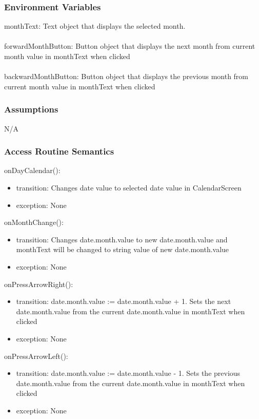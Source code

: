 \documentclass[12pt, titlepage]{article}
\begin{document}
\subsubsection{Environment Variables}

monthText: Text object that displays the selected month.\\\\
forwardMonthButton: Button object that displays the next month from current month value in monthText when clicked\\\\
backwardMonthButton: Button object that displays the previous month from current month value in monthText when clicked


\subsubsection{Assumptions}

N/A

\subsubsection{Access Routine Semantics}

\noindent onDayCalendar():
\begin{itemize}
	\item transition: Changes date value to selected date value in CalendarScreen 
	\item exception: None
\end{itemize}

\noindent onMonthChange():
\begin{itemize}
	\item transition: Changes date.month.value to new date.month.value and monthText will be changed to string value of new date.month.value
	\item exception: None 
\end{itemize}

\noindent onPressArrowRight():
\begin{itemize}
	\item transition: date.month.value := date.month.value + 1. Sets the next date.month.value from the current date.month.value in monthText when clicked
	\item exception: None 
\end{itemize}

\noindent onPressArrowLeft():
\begin{itemize}
	\item transition: date.month.value := date.month.value - 1. Sets the previous date.month.value from the current date.month.value in monthText when clicked
	\item exception: None 
\end{itemize}
\end{document}
